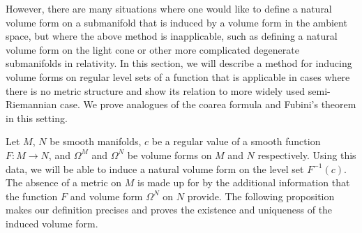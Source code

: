 However, there are many situations where one would like to define a natural volume form on a submanifold that is induced by a volume form in the ambient space, but where the above method is inapplicable, such as defining a natural volume form on the light cone or other more complicated degenerate submanifolds in relativity. In this section, we will describe a method for inducing volume forms on regular level sets of a function that is applicable in cases where there is no metric structure and show its relation to more widely used semi-Riemannian case.  We prove analogues of the coarea formula and Fubini's theorem in this setting. 

Let $M$, $N$ be smooth manifolds, $c$ be a regular value of a smooth function $F:M\rightarrow N$, and $\Omega^M$ and $\Omega^N$ be volume forms on $M$ and $N$ respectively.  Using this data, we will be able to induce a natural volume form on the level set $F^{-1}(c)$.  The absence of a metric on $M$ is made up for by the additional information that the function $F$ and volume form $\Omega^N$ on $N$ provide. The following proposition makes our definition precises and proves the existence and uniqueness of the induced volume form.


